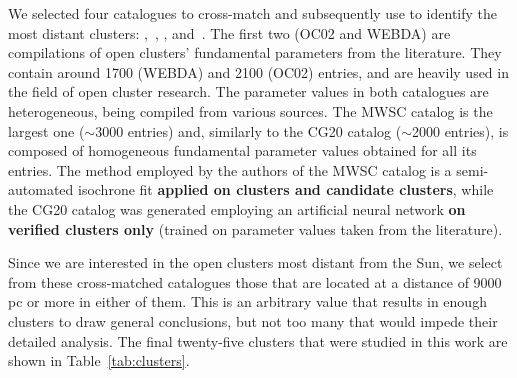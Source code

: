 \documentclass[referee]{aa}
\begin{document}
 We selected four catalogues to cross-match and subsequently use to identify the
 most distant clusters: \citet[][New Catalog of Optically Visible Open Clusters
 and Candidates, hereinafter OC02]{Dias_2002},~\citet[][hereinafter
 WEBDA\footnote{\url{https://webda.physics.muni.cz/}}]{Netopil_2012},
 \citet[][Milky Way Star Clusters Catalog, hereinafter MWSC]{Kharchenko_2012},
 and~\citet[][hereinafter CG20]{Cantat_2020}.
 The first two (OC02 and WEBDA) are compilations of open clusters' fundamental
 parameters from the literature. They contain around 1700 (WEBDA) and 2100 
 (OC02) entries, and are heavily used in the field of open cluster research.
 The parameter values in both catalogues are heterogeneous, being compiled from
 various sources.
 The MWSC catalog is the largest one ($\sim$3000 entries) and, similarly to the
 CG20 catalog ($\sim$2000 entries), is composed of homogeneous fundamental
 parameter values obtained for all its entries.
 The method employed by the authors of the MWSC catalog is a semi-automated
 isochrone fit \textbf{applied on clusters and candidate clusters}, while the
 CG20 catalog was generated employing an artificial neural network \textbf{on
 verified clusters only} (trained on parameter values taken from the
 literature).

 Since we are interested in the open clusters most distant from the Sun, we
 select from these cross-matched catalogues those that are located at a
 distance of 9000 pc or more in either of them. This is an arbitrary value that
 results in enough clusters to draw general conclusions, but not too many that
 would impede their detailed analysis. The final twenty-five clusters that were
 studied in this work are shown in Table~\ref{tab:clusters}.\\
\end{document}

